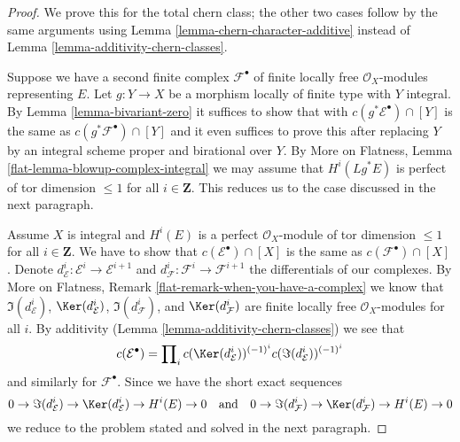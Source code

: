 \begin{proof}
We prove this for the total chern class; the other two cases follow
by the same arguments using
Lemma \ref{lemma-chern-character-additive}
instead of
Lemma \ref{lemma-additivity-chern-classes}.

\medskip\noindent
Suppose we have a second finite complex
$\mathcal{F}^\bullet$ of finite locally free $\mathcal{O}_X$-modules
representing $E$.
Let $g : Y \to X$ be a morphism locally of finite type with $Y$ integral.
By Lemma \ref{lemma-bivariant-zero} it suffices to show that
with $c(g^*\mathcal{E}^\bullet) \cap [Y]$ is the same as
$c(g^*\mathcal{F}^\bullet) \cap [Y]$ and it even suffices to prove
this after replacing $Y$ by an integral scheme proper and birational
over $Y$. By
More on Flatness, Lemma \ref{flat-lemma-blowup-complex-integral}
we may assume that $H^i(Lg^*E)$ is perfect of tor dimension $\leq 1$
for all $i \in \mathbf{Z}$.
This reduces us to the case discussed in the next paragraph.

\medskip\noindent
Assume $X$ is integral and $H^i(E)$ is a perfect $\mathcal{O}_X$-module
of tor dimension $\leq 1$ for all $i \in \mathbf{Z}$. We have to
show that $c(\mathcal{E}^\bullet) \cap [X]$ is the same as
$c(\mathcal{F}^\bullet) \cap [X]$. Denote
$d_\mathcal{E}^i : \mathcal{E}^i \to \mathcal{E}^{i + 1}$ and
$d_\mathcal{F}^i : \mathcal{F}^i \to \mathcal{F}^{i + 1}$
the differentials of our complexes. By
More on Flatness, Remark \ref{flat-remark-when-you-have-a-complex}
we know that $\Im(d_\mathcal{E}^i)$, $\Ker(d_\mathcal{E}^i)$,
$\Im(d_\mathcal{F}^i)$, and $\Ker(d_\mathcal{F}^i)$
are finite locally free $\mathcal{O}_X$-modules for all $i$.
By additivity (Lemma \ref{lemma-additivity-chern-classes}) we see that
$$
c(\mathcal{E}^\bullet) = \prod\nolimits_i
c(\Ker(d_\mathcal{E}^i))^{(-1)^i} c(\Im(d_\mathcal{E}^i))^{(-1)^i}
$$
and similarly for $\mathcal{F}^\bullet$. Since we have the
short exact sequences
$$
0 \to \Im(d_\mathcal{E}^i) \to \Ker(d_\mathcal{E}^i) \to H^i(E) \to 0
\quad\text{and}\quad
0 \to \Im(d_\mathcal{F}^i) \to \Ker(d_\mathcal{F}^i) \to H^i(E) \to 0
$$
we reduce to the problem stated and solved in the next paragraph.


\end{proof}
